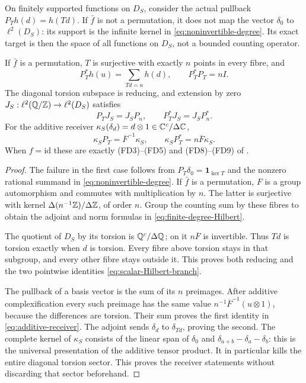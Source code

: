 \begin{theorem}
\label{thm:counting-action}
On finitely supported functions on $D_S$, consider the actual
pullback $P_T h(d)=h(Td)$. If $\bar f$ is not a permutation, it does
not map the vector $\delta_0$ to $\ell^2(D_S)$: its support is the
infinite kernel in \eqref{eq:noninvertible-degree}. Its exact target
is then the space of all functions on $D_S$, not a bounded counting
operator.

If $\bar f$ is a permutation, $T$ is surjective with exactly $n$
points in every fibre, and
\[
 P_T^*h(u)=\sum_{Td=u}h(d),\qquad P_T^*P_T=nI.
 \tag{SE25}\label{eq:finite-degree-Hilbert}
\]
The diagonal torsion subspace is reducing, and extension by zero
$J_S:\ell^2(\mathbb Q/\mathbb Z)\to\ell^2(D_S)$ satisfies
\[
 P_TJ_S=J_SP_n,\qquad P_T^*J_S=J_SP_n^*.
 \tag{SE26}\label{eq:scalar-Hilbert-branch}
\]
For the additive receiver
$\kappa_S(\delta_d)=d\otimes1\in\mathbb C^c/\Delta\mathbb C$,
\[
 \kappa_SP_T=\overline F^{-1}\kappa_S,
 \qquad \kappa_SP_T^*=n\overline F\kappa_S.
 \tag{SE27}\label{eq:additive-receiver}
\]
When $f=\mathrm{id}$ these are exactly (FD3)--(FD5) and (FD8)--(FD9)
of .
\end{theorem}
\begin{proof}
The failure in the first case follows from
$P_T\delta_0=\mathbf1_{\ker T}$ and the nonzero rational summand in
\eqref{eq:noninvertible-degree}. If $\bar f$ is a permutation, $F$
is a group automorphism and commutes with multiplication by $n$.
The latter is surjective with kernel $\Delta(n^{-1}\mathbb Z)/\Delta\mathbb Z$,
of order $n$. Group the counting sum by these fibres to obtain the
adjoint and norm formulas in \eqref{eq:finite-degree-Hilbert}.

The quotient of $D_S$ by its torsion is $\mathbb Q^c/\Delta\mathbb Q$; on it
$n\overline F$ is invertible. Thus $Td$ is torsion exactly when $d$
is torsion. Every fibre above torsion stays in that subgroup, and
every other fibre stays outside it. This proves both reducing and
the two pointwise identities \eqref{eq:scalar-Hilbert-branch}.

The pullback of a basis vector is the sum of its $n$ preimages.
After additive complexification every such preimage has the same
value $n^{-1}\overline F^{-1}(u\otimes1)$, because the differences
are torsion. Their sum proves the first identity in
\eqref{eq:additive-receiver}. The adjoint sends $\delta_d$ to
$\delta_{Td}$, proving the second. The complete kernel of
$\kappa_S$ consists of the linear span of
$\delta_0$ and $\delta_{a+b}-\delta_a-\delta_b$: this is the
universal presentation of the additive tensor product. It in
particular kills the entire diagonal torsion sector. This proves
the receiver statements without discarding that sector beforehand.
\end{proof}

